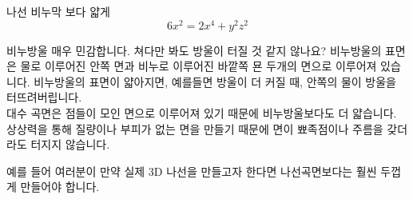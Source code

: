 \begin{surferPage}{나선}
비누막 보다 얇게\\
  \smallskip
\[6x^2	= 2x^4	+ y^2	z^2\]

\singlespacing
비누방울 매우 민감합니다. 쳐다만 봐도 방울이 터질 것 같지 않나요? 비누방울의 표면은 물로 이루어진 안쪽 면과 비누로 이루어진 바깥쪽 묜 두개의 면으로 이루어져 있습니다. 비누방울의 표면이 얇아지면, 예를들면  방울이 더 커질 때, 안쪽의 물이 방울을 터뜨려버립니다.\\
\vspace{0,3cm}
대수 곡면은 점들이 모인 면으로 이루어져 있기 때문에 비누방울보다도 더 얇습니다. 상상력을 통해 질량이나 부피가 없는 면을 만들기 때문에 면이 뾰족점이나 주름을 갖더라도 터지지 않습니다.\\
\vspace{0,3cm}

예를 들어 여러분이 만약 실제 3D 나선을 만들고자 한다면 나선곡면보다는 훨씬 두껍게 만들어야 합니다.
\end{surferPage}
